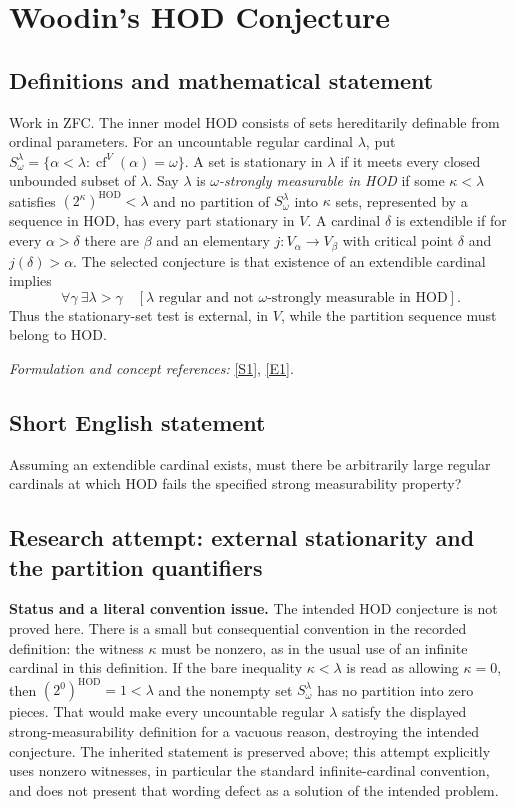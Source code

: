 \documentclass[11pt]{article}
\begin{document}
\section*{\texorpdfstring{Woodin's HOD Conjecture}{Woodin's HOD Conjecture}}\label{303}
\subsection{Definitions and mathematical statement}
Work in ZFC. The inner model $\mathrm{HOD}$ consists of sets hereditarily definable from ordinal parameters. For an uncountable regular cardinal $\lambda$, put $S^\lambda_\omega=\{\alpha<\lambda:\operatorname{cf}^V(\alpha)=\omega\}$. A set is stationary in $\lambda$ if it meets every closed unbounded subset of $\lambda$. Say $\lambda$ is \emph{$\omega$-strongly measurable in HOD} if some $\kappa<\lambda$ satisfies $(2^\kappa)^{\mathrm{HOD}}<\lambda$ and no partition of $S^\lambda_\omega$ into $\kappa$ sets, represented by a sequence in HOD, has every part stationary in $V$. A cardinal $\delta$ is extendible if for every $\alpha>\delta$ there are $\beta$ and an elementary $j:V_\alpha\to V_\beta$ with critical point $\delta$ and $j(\delta)>\alpha$. The selected conjecture is that existence of an extendible cardinal implies
\[
 \forall\gamma\ \exists\lambda>\gamma\quad
 [\lambda\text{ regular and not $\omega$-strongly measurable in HOD}].
\]
Thus the stationary-set test is external, in $V$, while the partition sequence must belong to HOD.
\par\smallskip\textit{Formulation and concept references:} \href{http://panhellenic-logic-symposium.org/12/slides/Day2_Bagaria.pdf}{[S1]}, \href{https://arxiv.org/html/1605.00613v1}{[E1]}.

\subsection{Short English statement}
Assuming an extendible cardinal exists, must there be arbitrarily large regular cardinals at which HOD fails the specified strong measurability property?
\subsection{Research attempt: external stationarity and the partition quantifiers}
\textbf{Status and a literal convention issue.} The intended HOD conjecture is not proved here. There is a small but consequential convention in the recorded definition: the witness $\kappa$ must be nonzero, as in the usual use of an infinite cardinal in this definition. If the bare inequality $\kappa<\lambda$ is read as allowing $\kappa=0$, then $(2^0)^{\mathrm{HOD}}=1<\lambda$ and the nonempty set $S^\lambda_\omega$ has no partition into zero pieces. That would make every uncountable regular $\lambda$ satisfy the displayed strong-measurability definition for a vacuous reason, destroying the intended conjecture. The inherited statement is preserved above; this attempt explicitly uses nonzero witnesses, in particular the standard infinite-cardinal convention, and does not present that wording defect as a solution of the intended problem.
\end{document}
